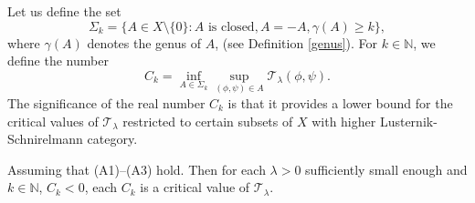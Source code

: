 \documentclass[reqno]{amsart}
\begin{document}
Let us define the set
\begin{equation*}
\Sigma_k=\lbrace A\in X\setminus\lbrace 0\rbrace: A \text{ is closed}, 
A=-A, \gamma(A)\geq k\rbrace,
\end{equation*}
where $\gamma(A)$ denotes the genus of $A$, (see Definition \ref{genus}). 
For $k\in\mathbb{N}$, we define the number
\[
C_k=\inf_{A\in \Sigma_k}\sup_{(\phi,\psi)\in A}\mathcal{T}_\lambda(\phi,\psi).
\]
The significance of the real number $C_k$ is that it provides a lower bound for the 
critical values of $\mathcal{T}_\lambda$ restricted to certain subsets of $X$ with 
higher Lusternik-Schnirelmann category.

\begin{lemma}\label{L2}
Assuming that  {\rm (A1)--(A3)} hold. Then 
for each $\lambda>0$ sufficiently small enough and $k\in \mathbb{N}$, $C_k<0$,
 each $C_k$ is a critical value of $\mathcal{T}_\lambda$.
\end{lemma}
\end{document}
